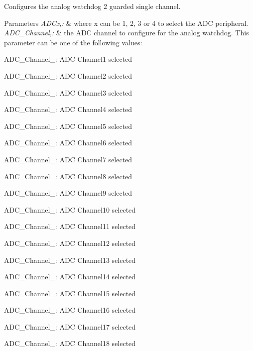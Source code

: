 Configures the analog watchdog 2 guarded single channel. 


\begin{DoxyParams}{Parameters}
{\em A\-D\-Cx,\-:} & where x can be 1, 2, 3 or 4 to select the A\-D\-C peripheral. \\
\hline
{\em A\-D\-C\-\_\-\-Channel,\-:} & the A\-D\-C channel to configure for the analog watchdog. This parameter can be one of the following values\-: \begin{DoxyItemize}
\item A\-D\-C\-\_\-\-Channel\-\_\-: A\-D\-C Channel1 selected \item A\-D\-C\-\_\-\-Channel\-\_\-: A\-D\-C Channel2 selected \item A\-D\-C\-\_\-\-Channel\-\_\-: A\-D\-C Channel3 selected \item A\-D\-C\-\_\-\-Channel\-\_\-: A\-D\-C Channel4 selected \item A\-D\-C\-\_\-\-Channel\-\_\-: A\-D\-C Channel5 selected \item A\-D\-C\-\_\-\-Channel\-\_\-: A\-D\-C Channel6 selected \item A\-D\-C\-\_\-\-Channel\-\_\-: A\-D\-C Channel7 selected \item A\-D\-C\-\_\-\-Channel\-\_\-: A\-D\-C Channel8 selected \item A\-D\-C\-\_\-\-Channel\-\_\-: A\-D\-C Channel9 selected \item A\-D\-C\-\_\-\-Channel\-\_\-: A\-D\-C Channel10 selected \item A\-D\-C\-\_\-\-Channel\-\_\-: A\-D\-C Channel11 selected \item A\-D\-C\-\_\-\-Channel\-\_\-: A\-D\-C Channel12 selected \item A\-D\-C\-\_\-\-Channel\-\_\-: A\-D\-C Channel13 selected \item A\-D\-C\-\_\-\-Channel\-\_\-: A\-D\-C Channel14 selected \item A\-D\-C\-\_\-\-Channel\-\_\-: A\-D\-C Channel15 selected \item A\-D\-C\-\_\-\-Channel\-\_\-: A\-D\-C Channel16 selected \item A\-D\-C\-\_\-\-Channel\-\_\-: A\-D\-C Channel17 selected \item A\-D\-C\-\_\-\-Channel\-\_\-: A\-D\-C Channel18 selected \end{DoxyItemize}
\\
\hline
\end{DoxyParams}

